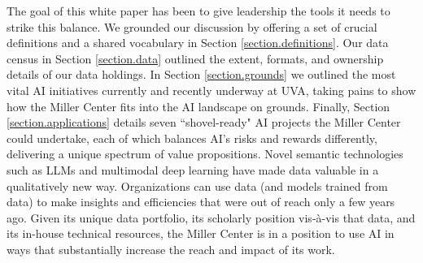 \documentclass[12pt, oneside]{article}   	%
\begin{document}
The goal of this white paper has been to give leadership the tools it needs to strike this balance.  We grounded our discussion by offering a set of crucial definitions and a shared vocabulary in Section \ref{section.definitions}.  Our data census in Section \ref{section.data} outlined the extent, formats, and ownership details of our data holdings.  In Section \ref{section.grounds} we outlined the most vital AI initiatives currently and recently underway at UVA, taking pains to show how the Miller Center fits into the AI landscape on grounds.  Finally, Section \ref{section.applications} details seven ``shovel-ready" AI projects the Miller Center could undertake, each of which balances AI's risks and rewards differently, delivering a unique spectrum of value propositions.  Novel semantic  technologies such as LLMs and multimodal deep learning have made data valuable in a qualitatively new way.  Organizations can use data (and models trained from data) to make insights and efficiencies that  were out of reach only a few years ago.  Given its unique data portfolio, its scholarly position vis-\`{a}-vis that data, and its in-house technical resources, the Miller Center is in a position to use AI in ways that substantially increase the reach and impact of its work. 










\pagebreak


\end{document}
